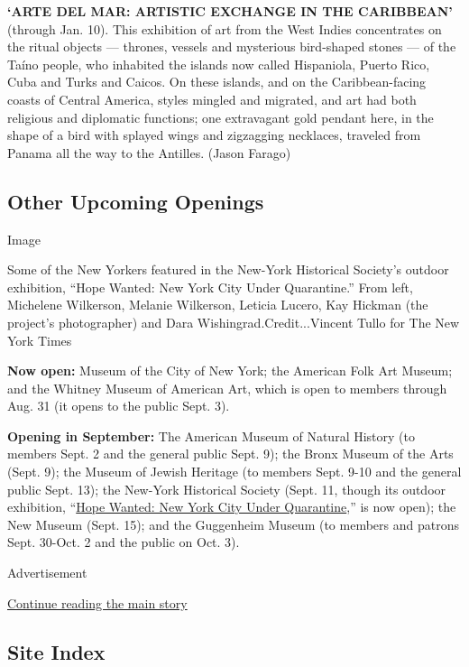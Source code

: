 \textbf{`ARTE DEL MAR: ARTISTIC EXCHANGE IN THE CARIBBEAN'} (through
Jan. 10). This exhibition of art from the West Indies concentrates on
the ritual objects --- thrones, vessels and mysterious bird-shaped
stones --- of the Taíno people, who inhabited the islands now called
Hispaniola, Puerto Rico, Cuba and Turks and Caicos. On these islands,
and on the Caribbean-facing coasts of Central America, styles mingled
and migrated, and art had both religious and diplomatic functions; one
extravagant gold pendant here, in the shape of a bird with splayed wings
and zigzagging necklaces, traveled from Panama all the way to the
Antilles. (Jason Farago)

\hypertarget{other-upcoming-openings}{%
\subsection{Other Upcoming Openings}\label{other-upcoming-openings}}

Image

Some of the New Yorkers featured in the New-York Historical Society's
outdoor exhibition, ``Hope Wanted: New York City Under Quarantine.''
From left, Michelene Wilkerson, Melanie Wilkerson, Leticia Lucero, Kay
Hickman (the project's photographer) and Dara
Wishingrad.Credit...Vincent Tullo for The New York Times

\textbf{Now open:} Museum of the City of New York; the American Folk Art
Museum; and the Whitney Museum of American Art, which is open to members
through Aug. 31 (it opens to the public Sept. 3).

\textbf{Opening in September:} The American Museum of Natural History
(to members Sept. 2 and the general public Sept. 9); the Bronx Museum of
the Arts (Sept. 9); the Museum of Jewish Heritage (to members Sept. 9-10
and the general public Sept. 13); the New-York Historical Society (Sept.
11, though its outdoor exhibition,
``\href{https://www.nytimes3xbfgragh.onion/2020/08/13/arts/design/New-York-Historical-covid-reopen.html}{Hope
Wanted: New York City Under Quarantine},'' is now open); the New Museum
(Sept. 15); and the Guggenheim Museum (to members and patrons Sept.
30-Oct. 2 and the public on Oct. 3).

Advertisement

\protect\hyperlink{after-bottom}{Continue reading the main story}

\hypertarget{site-index}{%
\subsection{Site Index}\label{site-index}}

